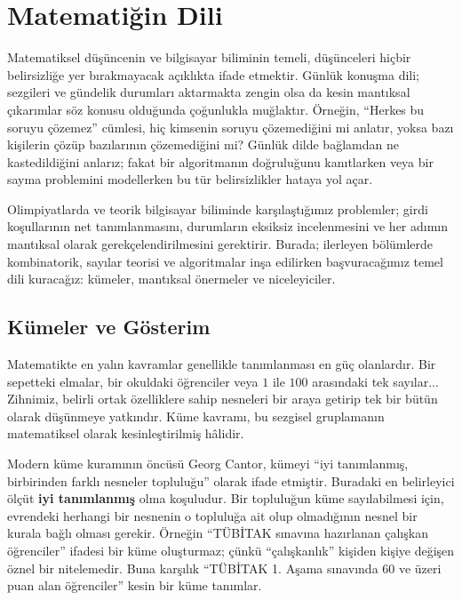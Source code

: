 \chapter[Matematiğin Dili · \textit{Temel}]{Matematiğin Dili}

Matematiksel düşüncenin ve bilgisayar biliminin temeli, düşünceleri hiçbir belirsizliğe yer bırakmayacak açıklıkta ifade etmektir. Günlük konuşma dili; sezgileri ve gündelik durumları aktarmakta zengin olsa da kesin mantıksal çıkarımlar söz konusu olduğunda çoğunlukla muğlaktır. Örneğin, ``Herkes bu soruyu çözemez'' cümlesi, hiç kimsenin soruyu çözemediğini mi anlatır, yoksa bazı kişilerin çözüp bazılarının çözemediğini mi? Günlük dilde bağlamdan ne kastedildiğini anlarız; fakat bir algoritmanın doğruluğunu kanıtlarken veya bir sayma problemini modellerken bu tür belirsizlikler hataya yol açar.

Olimpiyatlarda ve teorik bilgisayar biliminde karşılaştığımız problemler; girdi koşullarının net tanımlanmasını, durumların eksiksiz incelenmesini ve her adımın mantıksal olarak gerekçelendirilmesini gerektirir. Burada; ilerleyen bölümlerde kombinatorik, sayılar teorisi ve algoritmalar inşa edilirken başvuracağımız temel dili kuracağız: kümeler, mantıksal önermeler ve niceleyiciler.

\section{Kümeler ve Gösterim}

Matematikte en yalın kavramlar genellikle tanımlanması en güç olanlardır. Bir sepetteki elmalar, bir okuldaki öğrenciler veya $1$ ile $100$ arasındaki tek sayılar... Zihnimiz, belirli ortak özelliklere sahip nesneleri bir araya getirip tek bir bütün olarak düşünmeye yatkındır. Küme kavramı, bu sezgisel gruplamanın matematiksel olarak kesinleştirilmiş hâlidir.

Modern küme kuramının öncüsü Georg Cantor, kümeyi ``iyi tanımlanmış, birbirinden farklı nesneler topluluğu'' olarak ifade etmiştir. Buradaki en belirleyici ölçüt \textbf{iyi tanımlanmış} olma koşuludur. Bir topluluğun küme sayılabilmesi için, evrendeki herhangi bir nesnenin o topluluğa ait olup olmadığının nesnel bir kurala bağlı olması gerekir. Örneğin ``TÜBİTAK sınavına hazırlanan çalışkan öğrenciler'' ifadesi bir küme oluşturmaz; çünkü ``çalışkanlık'' kişiden kişiye değişen öznel bir nitelemedir. Buna karşılık ``TÜBİTAK 1. Aşama sınavında 60 ve üzeri puan alan öğrenciler'' kesin bir küme tanımlar.

